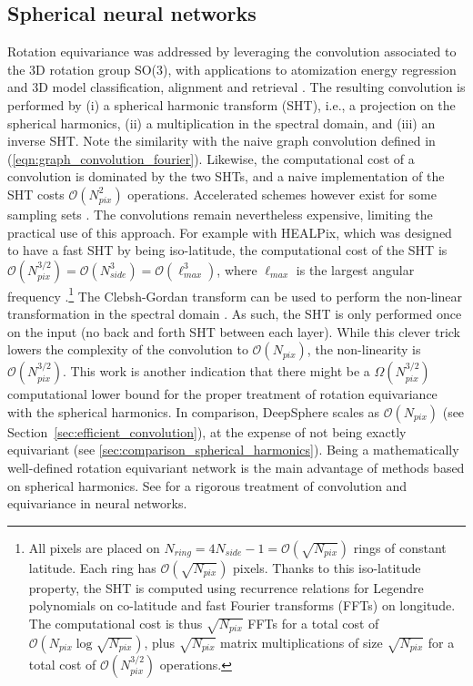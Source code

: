 \documentclass[final,twocolumn,3p,times,sort&compress]{elsarticle}
\newcommand{\secref}[1]{Section~\ref{sec:#1}}
\newcommand{\eqnref}[1]{(\ref{eqn:#1})}
\newcommand{\1}{\b{1}}              %
\newcommand{\0}{\b{0}}              %
\newcommand{\bO}{\mathcal{O}}
\begin{document}
\subsection{Spherical neural networks}

Rotation equivariance was addressed by leveraging the convolution associated to the 3D rotation group SO(3), with applications to atomization energy regression and 3D model classification, alignment and retrieval \citep{cohen2018sphericalcnn,esteves2017sphericalcnn}.
The resulting convolution is performed by (i) a spherical harmonic transform (SHT), i.e., a projection on the spherical harmonics, (ii) a  multiplication in the spectral domain, and (iii) an inverse SHT.
Note the similarity with the naive graph convolution defined in \eqnref{graph_convolution_fourier}.
Likewise, the computational cost of a convolution is dominated by the two SHTs, and a naive implementation of the SHT costs $\bO(N_{pix}^2)$ operations.
Accelerated schemes however exist for some sampling sets \citep[see][for examples]{mohlenkamp1999fast, rokhlin2006fast, reinecke2013libsharp}.
The convolutions remain nevertheless expensive, limiting the practical use of this approach.
For example with HEALPix, which was designed to have a fast SHT by being iso-latitude, the computational cost of the SHT is $\bO(N_{pix}^{3/2}) = \bO(N_{side}^3) = \bO(\ell_{max}^3)$, where $\ell_{max}$ is the largest angular frequency \citep{gorski2005healpix, reinecke2013libsharp}.\footnote{All pixels are placed on $N_{ring} = 4N_{side}-1 = \bO\left(\sqrt{N_{pix}}\right)$ rings of constant latitude.
Each ring has $\bO\left(\sqrt{N_{pix}}\right)$ pixels.
Thanks to this iso-latitude property, the SHT is computed using recurrence relations for Legendre polynomials on co-latitude and fast Fourier transforms (FFTs) on longitude.
The computational cost is thus $\sqrt{N_{pix}}$ FFTs for a total cost of $\bO\left( N_{pix} \log \sqrt{N_{pix}} \right)$, plus $\sqrt{N_{pix}}$ matrix multiplications of size $\sqrt{N_{pix}}$ for a total cost of $\bO\left(N_{pix}^{3/2}\right)$ operations.}
The Clebsh-Gordan transform can be used to perform the non-linear transformation in the spectral domain \citep{kondor2018clebsch}.
As such, the SHT is only performed once on the input (no back and forth SHT between each layer).
While this clever trick lowers the complexity of the convolution to $\bO(N_{pix})$, the non-linearity is $\bO(N_{pix}^{3/2})$.
This work is another indication that there might be a $\Omega(N_{pix}^{3/2})$ computational lower bound for the proper treatment of rotation equivariance with the spherical harmonics.
In comparison, DeepSphere scales as $\bO(N_{pix})$ (see \secref{efficient_convolution}), at the expense of not being exactly equivariant (see \ref{sec:comparison_spherical_harmonics}).
Being a mathematically well-defined rotation equivariant network is the main advantage of methods based on spherical harmonics.
See \citep{kondor2018equivariance} for a rigorous treatment of convolution and equivariance in neural networks.
\end{document}
